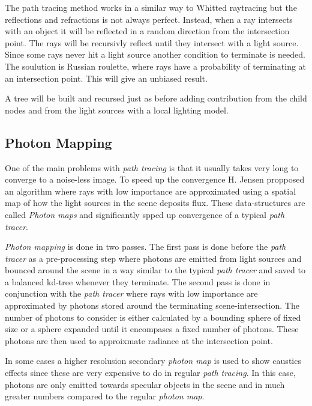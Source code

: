 \documentclass[a4paper, twocolumn]{article}
\begin{document}
    The path tracing method works in a similar way to Whitted raytracing but the reflections and refractions is not always perfect. Instead, when a ray intersects with an object it will be reflected in a random direction from the intersection point. The rays will be recursivly reflect until they intersect with a light source. Since some rays never hit a light source another condition to terminate is needed. The soulution is Russian roulette, where rays have a probability of terminating at an intersection point. This will give an unbiased result.

    A tree will be built and recursed just as before adding contribution from the child nodes and from the light sources with a local lighting model. 
    \subsection{Photon Mapping} \label{sec:photon_mapping}
    
    One of the main problems with \textit{path tracing} is that it usually takes very long to converge to a noise-less image. To speed up the convergence H. Jensen propposed an algorithm where rays with low importance are approximated using a spatial map of how the light sources in the scene deposits flux. These data-structures are called \textit{Photon maps} and significantly spped up convergence of a typical \textit{path tracer}.

    \textit{Photon mapping} is done in two passes. The first pass is done before the \textit{path tracer} as a pre-processing step where photons are emitted from light sources and bounced around the scene in a way similar to the typical \textit{path tracer} and saved to a balanced kd-tree whenever they terminate. The second pass is done in conjunction with the \textit{path tracer} where rays with low importance are approximated by photons stored around the terminating scene-intersection. The number of photons to consider is either calculated by a bounding sphere of fixed size or a sphere expanded until it encompases  a fixed number of photons. These photons are then used to approixmate radiance at the intersection point. 

In some cases a higher resolusion secondary \textit{photon map} is used to show caustics effects since these are very expensive to do in regular \textit{path tracing}. In this case, photons are only emitted towards specular objects in the scene and in much greater numbers compared to the regular \textit{photon map}.
\end{document}
